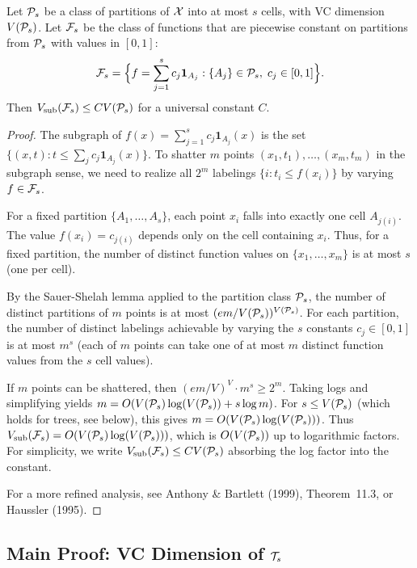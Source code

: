 \documentclass[12pt]{article}
\begin{document}
\begin{lemma}
\label{lem:pseudo-partition}
Let $\mathcal{P}_s$ be a class of partitions of $\mathcal{X}$ into at most $s$ cells, with VC dimension $V(\mathcal{P}_s)$. Let $\mathcal{F}_s$ be the class of functions that are piecewise constant on partitions from $\mathcal{P}_s$ with values in $[0,1]$:
\[
\mathcal{F}_s = \Bigl\{ f = \sum_{j=1}^s c_j \mathbf{1}_{A_j} : \{A_j\} \in \mathcal{P}_s, \; c_j \in [0,1] \Bigr\}.
\]
Then $V_{\text{sub}}(\mathcal{F}_s) \le C V(\mathcal{P}_s)$ for a universal constant $C$.
\end{lemma}

\begin{proof}
The subgraph of $f(x) = \sum_{j=1}^s c_j \mathbf{1}_{A_j}(x)$ is the set $\{(x,t) : t \le \sum_j c_j \mathbf{1}_{A_j}(x)\}$. To shatter $m$ points $(x_1, t_1), \ldots, (x_m, t_m)$ in the subgraph sense, we need to realize all $2^m$ labelings $\{i : t_i \le f(x_i)\}$ by varying $f \in \mathcal{F}_s$.

For a fixed partition $\{A_1, \ldots, A_s\}$, each point $x_i$ falls into exactly one cell $A_{j(i)}$. The value $f(x_i) = c_{j(i)}$ depends only on the cell containing $x_i$. Thus, for a fixed partition, the number of distinct function values on $\{x_1, \ldots, x_m\}$ is at most $s$ (one per cell).

By the Sauer-Shelah lemma applied to the partition class $\mathcal{P}_s$, the number of distinct partitions of $m$ points is at most $(em/V(\mathcal{P}_s))^{V(\mathcal{P}_s)}$. For each partition, the number of distinct labelings achievable by varying the $s$ constants $c_j \in [0,1]$ is at most $m^s$ (each of $m$ points can take one of at most $m$ distinct function values from the $s$ cell values).

If $m$ points can be shattered, then $(em/V)^V \cdot m^s \ge 2^m$. Taking logs and simplifying yields $m = O(V(\mathcal{P}_s) \log(V(\mathcal{P}_s)) + s \log m)$. For $s \le V(\mathcal{P}_s)$ (which holds for trees, see below), this gives $m = O(V(\mathcal{P}_s) \log(V(\mathcal{P}_s)))$. Thus $V_{\text{sub}}(\mathcal{F}_s) = O(V(\mathcal{P}_s) \log(V(\mathcal{P}_s)))$, which is $O(V(\mathcal{P}_s))$ up to logarithmic factors. For simplicity, we write $V_{\text{sub}}(\mathcal{F}_s) \le C V(\mathcal{P}_s)$ absorbing the log factor into the constant.

For a more refined analysis, see Anthony \& Bartlett (1999), Theorem~11.3, or Haussler (1995).
\end{proof}

\subsection{Main Proof: VC Dimension of $\mathcal{T}_s$}
\end{document}
